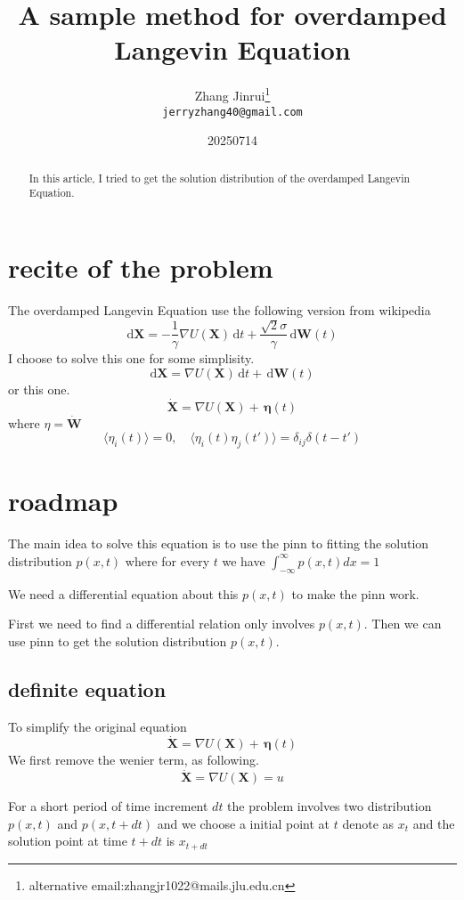 \documentclass{article}
\title{A sample method for overdamped Langevin Equation}
\author{Zhang Jinrui\thanks{alternative email:zhangjr1022@mails.jlu.edu.cn} \\ \texttt{jerryzhang40@gmail.com}}
\date{20250714}  %
\theoremstyle{definition} %
\begin{document}
\maketitle

\begin{abstract}
    In this article, I tried to get the solution
    distribution of the overdamped Langevin Equation.
\end{abstract}

\section{recite of the problem}
The overdamped Langevin Equation use the following
version from wikipedia
\cite[LangevinDynamics]{LangevinDynamics}
\[
    \mathrm{d}\mathbf{X} = -\frac{1}{\gamma} \nabla U(\mathbf{X}) \,\mathrm{d}t + \frac{\sqrt{2}\sigma}{\gamma} \,\mathrm{d}\mathbf{W}(t)
\]
I choose to solve this one for some simplisity.
\[
    \mathrm{d}\mathbf{X} = \nabla U(\mathbf{X}) \,\mathrm{d}t +  \,\mathrm{d}\mathbf{W}(t)
\]
or this one.
\[
    \dot{\mathbf{X}} =  \nabla U(\mathbf{X}) +  \,\boldsymbol{\eta}(t)
\]
where \(\eta=\dot{\mathbf{W}}\)
\[
    \langle \eta_i(t) \rangle = 0, \quad
    \langle \eta_i(t) \eta_j(t') \rangle = \delta_{ij} \delta(t - t')
\]

\section{roadmap}
The main idea to solve this equation is
to use the pinn\cite{raissi2017physics} to fitting the solution
distribution \(p(x,t)\)
where for every \(t\) we have
\(\int_{-\infty}^{\infty}p(x,t)dx=1\)

We need a differential equation about this
\(p(x,t)\) to make the pinn work.

First we need to find a differential
relation only involves \(p(x,t)\).
Then we can use pinn to get the solution
distribution \(p(x,t)\).

\subsection{definite equation}
To simplify the original equation
\[
    \dot{\mathbf{X}} =  \nabla U(\mathbf{X}) +  \,\boldsymbol{\eta}(t)
\]
We first remove the wenier term,
as following.
\[
    \dot{\mathbf{X}} =  \nabla U(\mathbf{X})=u
\]

For a short period of time increment \(dt\)
the problem involves two distribution
\(p(x,t)\) and \(p(x,t+dt)\)
and we choose a initial point at \(t\)
denote as \(x_t\) and the solution point
at time \(t+dt\) is \(x_{t+dt}\)
\end{document}
